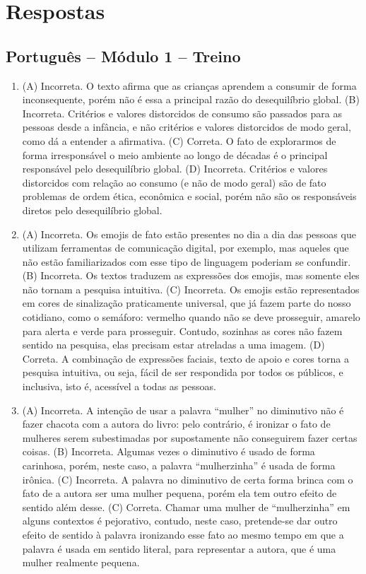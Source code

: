 \chapter{Respostas}
\pagestyle{plain}
\footnotesize

\pagecolor{gray!40}

\section*{Português – Módulo 1 – Treino}

\begin{enumerate}
\item (A) Incorreta. O texto afirma que as crianças aprendem a consumir de forma inconsequente, porém não é essa a principal razão do desequilíbrio global.
(B) Incorreta. Critérios e valores distorcidos de consumo são passados para as pessoas desde a infância, e não critérios e valores distorcidos de modo geral, como dá a entender a afirmativa.
(C) Correta. O fato de explorarmos de forma irresponsável o meio ambiente ao longo de décadas é o principal responsável pelo desequilíbrio global.
(D) Incorreta. Critérios e valores distorcidos com relação ao consumo (e não de modo geral) são de fato problemas de ordem ética, econômica e social, porém não são os responsáveis diretos pelo desequilíbrio global.

\item (A) Incorreta. Os emojis de fato estão presentes no dia a dia das pessoas
que utilizam ferramentas de comunicação digital, por exemplo, mas
aqueles que não estão familiarizados com esse tipo de linguagem poderiam
se confundir.
(B) Incorreta. Os textos traduzem as expressões dos emojis, mas somente
eles não tornam a pesquisa intuitiva.
(C) Incorreta. Os emojis estão representados em cores de sinalização
praticamente universal, que já fazem parte do nosso cotidiano, como o
semáforo: vermelho quando não se deve prosseguir, amarelo para alerta e
verde para prosseguir. Contudo, sozinhas as cores não fazem sentido na
pesquisa, elas precisam estar atreladas a uma imagem.
(D) Correta. A combinação de expressões faciais, texto de apoio e cores
torna a pesquisa intuitiva, ou seja, fácil de ser respondida por todos
os públicos, e inclusiva, isto é, acessível a todas as pessoas.

\item (A) Incorreta. A intenção de usar a palavra ``mulher'' no diminutivo não
é fazer chacota com a autora do livro: pelo contrário, é ironizar o fato
de mulheres serem subestimadas por supostamente não conseguirem fazer
certas coisas.
(B) Incorreta. Algumas vezes o diminutivo é usado de forma carinhosa,
porém, neste caso, a palavra ``mulherzinha'' é usada de forma irônica.
(C) Incorreta. A palavra no diminutivo de certa forma brinca com o fato
de a autora ser uma mulher pequena, porém ela tem outro efeito de
sentido além desse.
(C) Correta. Chamar uma mulher de ``mulherzinha'' em alguns contextos é
pejorativo, contudo, neste caso, pretende-se dar outro efeito de sentido
à palavra ironizando esse fato ao mesmo tempo em que a palavra é usada
em sentido literal, para representar a autora, que é uma mulher
realmente pequena.
\end{enumerate}

